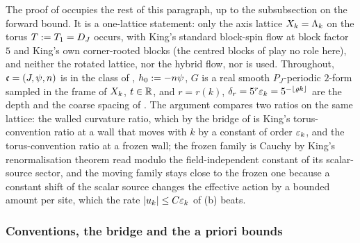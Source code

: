 \providecommand{\Ztor}{\ensuremath{\Zun^{\rm tor}}}
\providecommand{\hinf}{\ensuremath{h_\infty}}

The proof of  occupies the rest of this paragraph, up to the subsubsection on the forward bound. It is a one-lattice statement: only the axis lattice $X_k=\Lambda_k$ on the torus $T:= T_1=D_J$ occurs, with King's standard block-spin flow at block factor $5$ and King's own corner-rooted blocks (the centred blocks of  play no role here), and neither the rotated lattice, nor the hybrid flow, nor  is used. Throughout, $\mathfrak c=(J,\psi,n)$ is in the class of , $h_0:=-n\psi$, $G$ is a real smooth $P_J$-periodic $2$-form sampled in the frame of $X_k$, $t\in\mathbb R$, and $r=r(k)$, $\delta_r=5^r\varepsilon_k=5^{-\lfloor\varrho k\rfloor}$ are the depth and the coarse spacing of . The argument compares two ratios on the same lattice: the walled curvature ratio, which by the bridge of  is King's torus-convention ratio at a wall that moves with $k$ by a constant of order $\varepsilon_k$, and the torus-convention ratio at a frozen wall; the frozen family is Cauchy by King's renormalisation theorem read modulo the field-independent constant of its scalar-source sector, and the moving family stays close to the frozen one because a constant shift of the scalar source changes the effective action by a bounded amount per site, which the rate $|u_k|\le C\varepsilon_k$ of (b) beats.

\subsubsection*{Conventions, the bridge and the a priori bounds}

